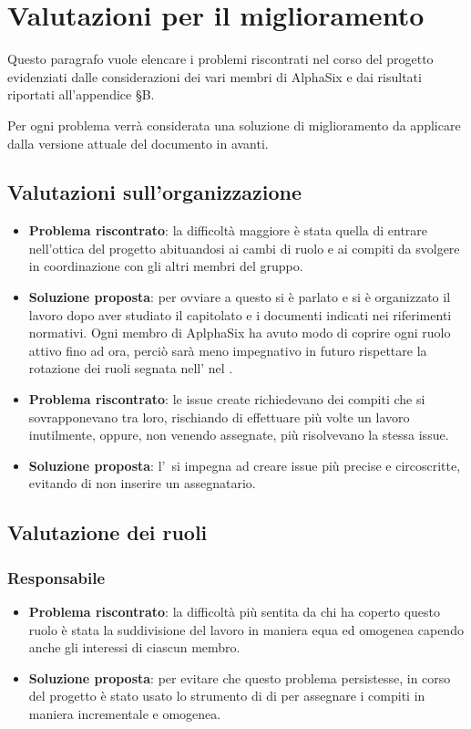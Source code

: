 \newpage
\section{Valutazioni per il miglioramento}	\label{C}
	
	Questo paragrafo vuole elencare i problemi riscontrati nel corso del progetto evidenziati dalle considerazioni dei vari membri di AlphaSix e dai risultati riportati all'appendice §B.
	
	Per ogni problema verrà considerata una soluzione di miglioramento da applicare dalla versione attuale del documento in avanti.

	\subsection{Valutazioni sull'organizzazione}
		\begin{itemize}
			\item \textbf{Problema riscontrato}: la difficoltà maggiore è stata quella di entrare nell'ottica del progetto abituandosi ai cambi di ruolo e ai compiti da svolgere in coordinazione con gli altri membri del gruppo.
			\item \textbf{Soluzione proposta}: per ovviare a questo si è parlato e si è organizzato il lavoro dopo aver studiato il capitolato e i documenti indicati nei riferimenti normativi. Ogni membro di AplphaSix ha avuto modo di coprire ogni ruolo attivo fino ad ora, perciò sarà meno impegnativo in futuro rispettare la rotazione dei ruoli segnata nell' nel \Doc{\PdPv}.
			\item \textbf{Problema riscontrato}: le issue create richiedevano dei compiti che si sovrapponevano tra loro, rischiando di effettuare più volte un lavoro inutilmente, oppure, non venendo assegnate, più  risolvevano la stessa issue.
			\item \textbf{Soluzione proposta}: l'\Amm\ si impegna ad creare issue più precise e circoscritte, evitando di non inserire un assegnatario.
		\end{itemize}
	
	\subsection{Valutazione dei ruoli}
	
		\subsubsection{Responsabile}
			\begin{itemize}
				\item \textbf{Problema riscontrato}: la difficoltà più sentita da chi ha coperto questo ruolo è stata la suddivisione del lavoro in maniera equa ed omogenea capendo anche gli interessi di ciascun membro.
				\item \textbf{Soluzione proposta}: per evitare che questo problema persistesse, in corso del progetto è stato usato lo strumento di  di  per assegnare i compiti in maniera incrementale e omogenea.
			\end{itemize}

